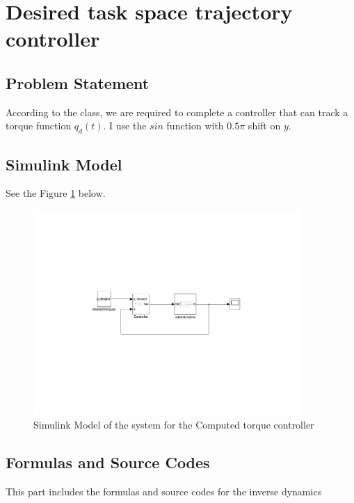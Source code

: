 \documentclass{article}
\begin{document}
\newpage

\section{\centering \Large Desired task space trajectory controller} 

\subsection*{Problem Statement}

According to the class, we are required to complete a controller that can track a torque function $q_d(t)$. I use the $sin$ function with $0.5 \pi$ shift on $y$.

\subsection{Simulink Model}
See the Figure \ref{fig:model_computed} below.
\begin{figure}[ht]
    \centering
    \includegraphics[width=0.9\textwidth]{figures/model_computed.pdf}
    \caption{Simulink Model of the system for the Computed torque controller}
    \label{fig:model_computed}
\end{figure}

\subsection{Formulas and Source Codes}
This part includes the formulas and source codes for the inverse dynamics
\end{document}

